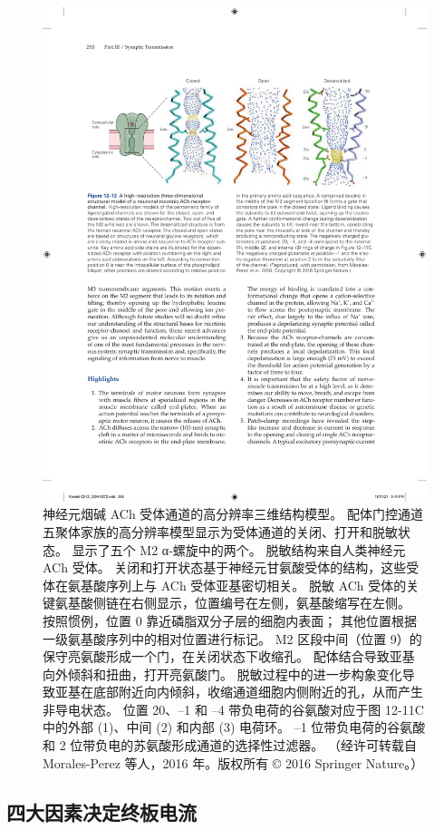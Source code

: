 \begin{figure}[htbp]
	\centering
	\includegraphics[width=0.9\linewidth]{chap12/fig_12_12}
	\caption{神经元烟碱 ACh 受体通道的高分辨率三维结构模型。 配体门控通道五聚体家族的高分辨率模型显示为受体通道的关闭、打开和脱敏状态。 显示了五个 M2 α-螺旋中的两个。 脱敏结构来自人类神经元 ACh 受体。 关闭和打开状态基于神经元甘氨酸受体的结构，这些受体在氨基酸序列上与 ACh 受体亚基密切相关。 脱敏 ACh 受体的关键氨基酸侧链在右侧显示，位置编号在左侧，氨基酸缩写在左侧。 按照惯例，位置 0 靠近磷脂双分子层的细胞内表面； 其他位置根据一级氨基酸序列中的相对位置进行标记。 M2 区段中间（位置 9）的保守亮氨酸形成一个门，在关闭状态下收缩孔。 配体结合导致亚基向外倾斜和扭曲，打开亮氨酸门。 脱敏过程中的进一步构象变化导致亚基在底部附近向内倾斜，收缩通道细胞内侧附近的孔，从而产生非导电状态。 位置 20、–1 和 –4 带负电荷的谷氨酸对应于图 12-11C 中的外部 (1)、中间 (2) 和内部 (3) 电荷环。 –1 位带负电荷的谷氨酸和 2 位带负电的苏氨酸形成通道的选择性过滤器。 （经许可转载自 Morales-Perez 等人，2016 年。版权所有 © 2016 Springer Nature。）}
	\label{fig:12_12}
\end{figure}



\subsection{四大因素决定终板电流}

